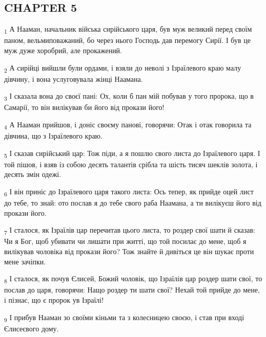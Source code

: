 \subsection{CHAPTER 5}
\begin{tcolorbox}
\textsubscript{1} А Нааман, начальник війська сирійського царя, був муж великий перед своїм паном, вельмиповажаний, бо через нього Господь дав перемогу Сирії. І був це муж дуже хоробрий, але прокажений.
\end{tcolorbox}
\begin{tcolorbox}
\textsubscript{2} А сирійці вийшли були ордами, і взяли до неволі з Ізраїлевого краю малу дівчину, і вона услуговувала жінці Наамана.
\end{tcolorbox}
\begin{tcolorbox}
\textsubscript{3} І сказала вона до своєї пані: Ох, коли б пан мій побував у того пророка, що в Самарії, то він вилікував би його від прокази його!
\end{tcolorbox}
\begin{tcolorbox}
\textsubscript{4} А Нааман прийшов, і доніс своєму панові, говорячи: Отак і отак говорила та дівчина, що з Ізраїлевого краю.
\end{tcolorbox}
\begin{tcolorbox}
\textsubscript{5} І сказав сирійський цар: Тож піди, а я пошлю свого листа до Ізраїлевого царя. І той пішов, і взяв із собою десять талантів срібла та шість тисяч шеклів золота, і десять змін одежі.
\end{tcolorbox}
\begin{tcolorbox}
\textsubscript{6} І він приніс до Ізраїлевого царя такого листа: Ось тепер, як прийде оцей лист до тебе, то знай: ото послав я до тебе свого раба Наамана, а ти вилікуєш його від прокази його.
\end{tcolorbox}
\begin{tcolorbox}
\textsubscript{7} І сталося, як Ізраїлів цар перечитав цього листа, то роздер свої шати й сказав: Чи я Бог, щоб убивати чи лишати при житті, що той посилає до мене, щоб я вилікував чоловіка від прокази його? Тож знайте й дивіться це він шукає проти мене зачіпки.
\end{tcolorbox}
\begin{tcolorbox}
\textsubscript{8} І сталося, як почув Єлисей, Божий чоловік, що Ізраїлів цар роздер шати свої, то послав до царя, говорячи: Нащо роздер ти шати свої? Нехай той прийде до мене, і пізнає, що є пророк ув Ізраїлі!
\end{tcolorbox}
\begin{tcolorbox}
\textsubscript{9} І прибув Нааман зо своїми кіньми та з колесницею своєю, і став при вході Єлисеєвого дому.
\end{tcolorbox}
